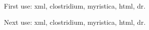 \documentclass[12pt]{article}
\begin{document}
First use: \gls{xml}, \gls{clostridium}, \gls{myristica}, \gls{html}, \gls{dr}. 

Next use: \gls{xml}, \gls{clostridium}, \gls{myristica}, \gls{html}, \gls{dr}. 
\end{document}
